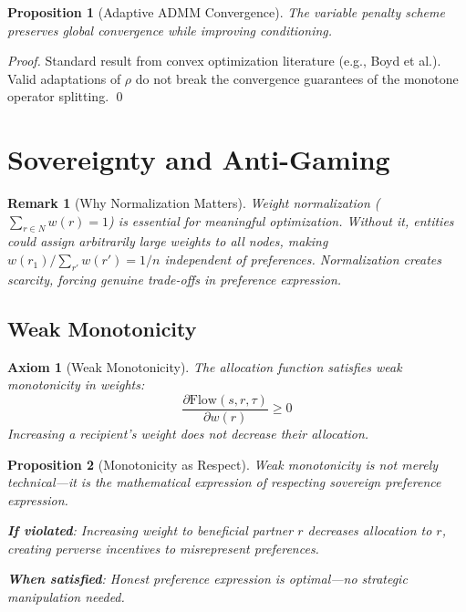 \documentclass[11pt]{article}
\newtheorem{proposition}{Proposition}
\newtheorem{remark}{Remark}
\newtheorem{axiom}{Axiom}
\begin{document}
\begin{proposition}[Adaptive ADMM Convergence]
The variable penalty scheme preserves global convergence while improving conditioning.
\end{proposition}

\begin{proof}
Standard result from convex optimization literature (e.g., Boyd et al.). Valid adaptations of $\rho$ do not break the convergence guarantees of the monotone operator splitting.
\qed
\end{proof}

\section{Sovereignty and Anti-Gaming}

\begin{remark}[Why Normalization Matters]
Weight normalization ($\sum_{r \in N} w(r) = 1$) is essential for meaningful optimization. Without it, entities could assign arbitrarily large weights to all nodes, making $w(r_1)/\sum_{r'} w(r') = 1/n$ independent of preferences. Normalization creates scarcity, forcing genuine trade-offs in preference expression.
\end{remark}

\subsection{Weak Monotonicity}

\begin{axiom}[Weak Monotonicity]
\label{ax:weak-monotonicity}
The allocation function satisfies weak monotonicity in weights:
\[
\frac{\partial \text{Flow}(s, r, \tau)}{\partial w(r)} \geq 0
\]
Increasing a recipient's weight does not decrease their allocation.
\end{axiom}

\begin{proposition}[Monotonicity as Respect]
Weak monotonicity is not merely technical—it is the mathematical expression of respecting sovereign preference expression.

\textbf{If violated}: Increasing weight to beneficial partner $r$ decreases allocation to $r$, creating perverse incentives to misrepresent preferences.

\textbf{When satisfied}: Honest preference expression is optimal—no strategic manipulation needed.
\end{proposition}
\end{document}
